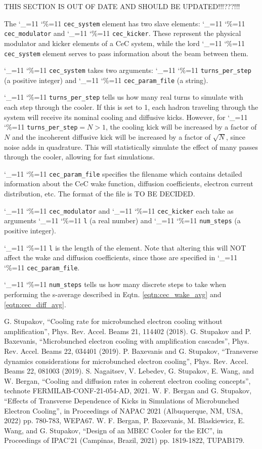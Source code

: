 \documentclass[letterpaper,11pt]{article}
\newcommand{\vn}{\begingroup\catcode`\_=11 \catcode`\%=11 \dottcmd}
\newcommand\dottcmd[1]{\texttt{#1}\endgroup}
\begin{document}
THIS SECTION IS OUT OF DATE AND SHOULD BE UPDATED!!!???!!!

The \vn{cec_system} element has two slave elements: \vn{cec_modulator} and \vn{cec_kicker}. These represent the physical modulator and kicker elements of a CeC system, while the lord \vn{cec_system} element serves to pass information about the beam between them.

\vn{cec_system} takes two arguments: \vn{turns_per_step} (a positive integer) and \vn{cec_param_file} (a string).

\vn{turns_per_step} tells us how many real turns to simulate with each step through the cooler. If this is set to 1, each hadron traveling through the system will receive its nominal cooling and diffusive kicks. However, for \vn{turns_per_step}$ = N > 1$, the cooling kick will be increased by a factor of $N$ and the incoherent diffusive kick will be increased by a factor of $\sqrt{N}$, since noise adds in quadrature. This will statistically simulate the effect of many passes through the cooler, allowing for fast simulations.

\vn{cec_param_file} specifies the filename which contains detailed information about the CeC wake function, diffusion coefficients, electron current distribution, etc. The format of the file is TO BE DECIDED.

\vn{cec_modulator} and \vn{cec_kicker} each take as arguments \vn{l} (a real number) and \vn{num_steps} (a positive integer).

\vn{l} is the length of the element. Note that altering this will NOT affect the wake and diffusion coefficients, since those are specified in \vn{cec_param_file}.

\vn{num_steps} tells us how many discrete steps to take when performing the s-average described in Eqtn. \ref{eqtn:cec_wake_avg} and \ref{eqtn:cec_diff_avg}.

\begin{thebibliography}{9}   %
		G. Stupakov, ``Cooling rate for microbunched electron cooling without amplification'', Phys. Rev. Accel. Beams 21, 114402 (2018).
		G. Stupakov and P. Baxevanis, ``Microbunched electron cooling with amplification cascades'', Phys. Rev. Accel. Beams 22, 034401 (2019).
		P. Baxevanis and G. Stupakov, ``Transverse dynamics considerations for microbunched electron cooling'', Phys. Rev. Accel. Beams 22, 081003 (2019).
		 S. Nagaitsev, V. Lebedev, G. Stupakov, E. Wang, and W. Bergan, ``Cooling and diffusion rates in coherent electron  cooling concepts'', technote FERMILAB-CONF-21-054-AD, 2021.
                W. F. Bergan and G. Stupakov, ``Effects of Transverse Dependence of Kicks in Simulations of Microbunched Electron Cooling'', in Proceedings of NAPAC 2021 (Albuquerque, NM, USA, 2022) pp. 780-783, WEPA67.
                W. F. Bergan, P. Baxevanis, M. Blaskiewicz, E. Wang, and G. Stupakov, ``Design of an MBEC Cooler for the EIC'', in Proceedings of IPAC'21 (Campinas, Brazil, 2021) pp. 1819-1822, TUPAB179.
\end{thebibliography}
\end{document}
